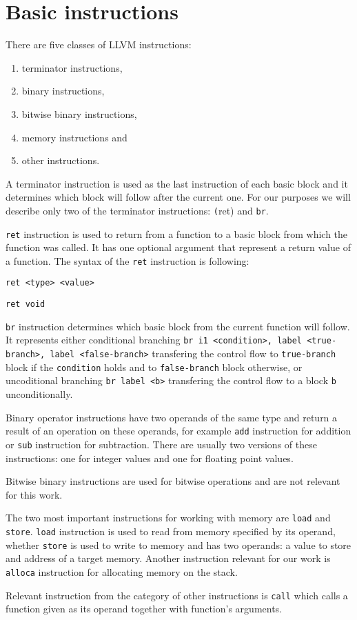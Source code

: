 \section{Basic instructions}

There are five classes of LLVM instructions:

\begin{enumerate}
 \item terminator instructions,
 \item binary instructions,
 \item bitwise binary instructions,
 \item memory instructions and
 \item other instructions.
\end{enumerate}

A terminator instruction is used as the last instruction of each basic block
and it determines which block will follow after the current one. For our
purposes we will describe only two of the terminator instructions: \texttt(ret)
and \texttt{br}.

\texttt{ret} instruction is used to return from a function to a basic block
from which the function was called. It has one optional argument that represent
a return value of a function. The syntax of the \texttt{ret} instruction is
following:

\medskip
\noindent \texttt{ret <type> <value>} 

\noindent \texttt{ret void}
\medskip

\texttt{br} instruction determines which basic block from the current function
will follow. It represents either conditional branching \texttt{br i1
<condition>, label <true-branch>, label <false-branch>} transfering the control
flow to \texttt{true-branch} block if the \texttt{condition} holds and to
\texttt{false-branch} block otherwise, or uncoditional branching \texttt{br
label <b>} transfering the control flow to a block \texttt{b} unconditionally.

Binary operator instructions have two operands of the same type and return a
result of an operation on these operands, for example \texttt{add} instruction
for addition or \texttt{sub} instruction for subtraction. There are usually two
    versions of these instructions: one for integer values and one for floating
    point values.

Bitwise binary instructions are used for bitwise operations and are not
relevant for this work.

The two most important instructions for working with memory are \texttt{load}
and \texttt{store}. \texttt{load} instruction is used to read from memory
specified by its operand, whether \texttt{store} is used to write to memory and
has two operands: a value to store and address of a target memory. Another
instruction relevant for our work is \texttt{alloca} instruction for allocating
memory on the stack.

Relevant instruction from the category of other instructions is \texttt{call}
which calls a function given as its operand together with function's arguments.
